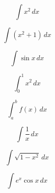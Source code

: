 \documentclass{article}
\begin{document}
\[
\int x^2\,dx
\]

\[
\int (x^2+1)\,dx
\]

\[
\int \sin x\,dx
\]

\[
\int_0^1 x^2\,dx
\]

\[
\int_a^b f(x)\,dx
\]

\[
\int \frac{1}{x}\,dx
\]

\[
\int \sqrt{1-x^2}\,dx
\]

\[
\int e^x \cos x\,dx
\]
\end{document}

